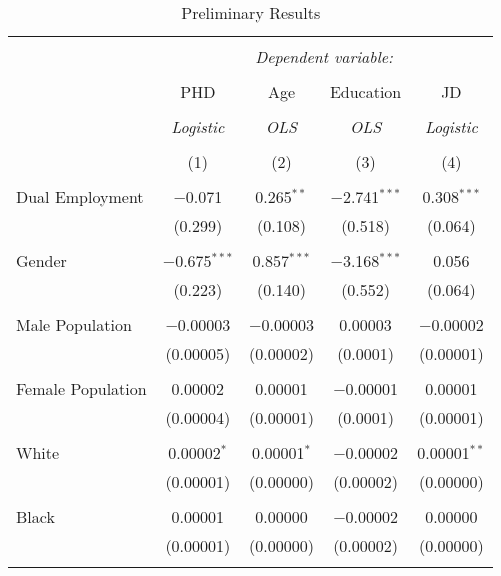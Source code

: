 \documentclass[12pt,english]{article}
\begin{document}




\begin{table}[!htbp] \centering 
  \caption{Preliminary Results} 
  \label{tab:estimates} 
\begin{tabular}{@{\extracolsep{5pt}}lcccc} 
\\[-1.8ex]\hline 
\hline \\[-1.8ex] 
 & \multicolumn{4}{c}{\textit{Dependent variable:}} \\ 
\cline{2-5} 
\\[-1.8ex] & PHD & Age & Education & JD\\ 
\\[-1.8ex] & \textit{Logistic} & \textit{OLS} & \textit{OLS} & \textit{Logistic} \\ 
\\[-1.8ex] & (1) & (2) & (3) & (4)\\ 
\hline \\[-1.8ex] 
 Dual Employment & $-$0.071 & 0.265$^{**}$ & $-$2.741$^{***}$ & 0.308$^{***}$ \\ 
  & (0.299) & (0.108) & (0.518) & (0.064) \\ 
  & & & & \\ 
 Gender & $-$0.675$^{***}$ & 0.857$^{***}$ & $-$3.168$^{***}$ & 0.056 \\ 
  & (0.223) & (0.140) & (0.552) & (0.064) \\ 
  & & & & \\ 
 Male Population & $-$0.00003 & $-$0.00003 & 0.00003 & $-$0.00002 \\ 
  & (0.00005) & (0.00002) & (0.0001) & (0.00001) \\ 
  & & & & \\ 
 Female Population & 0.00002 & 0.00001 & $-$0.00001 & 0.00001 \\ 
  & (0.00004) & (0.00001) & (0.0001) & (0.00001) \\ 
  & & & & \\ 
 White & 0.00002$^{*}$ & 0.00001$^{*}$ & $-$0.00002 & 0.00001$^{**}$ \\ 
  & (0.00001) & (0.00000) & (0.00002) & (0.00000) \\ 
  & & & & \\ 
 Black & 0.00001 & 0.00000 & $-$0.00002 & 0.00000 \\ 
  & (0.00001) & (0.00000) & (0.00002) & (0.00000) \\ 
  & & & & \\ 


\end{tabular}
\end{table}
\end{document}
